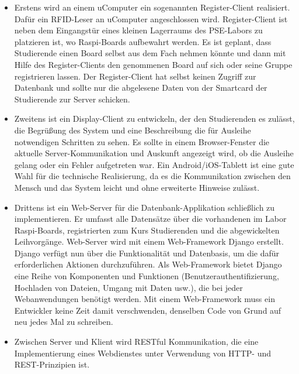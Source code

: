 \begin{itemize}
	\item Erstens wird an einem uComputer ein sogenannten Register-Client realisiert. Dafür ein RFID-Leser an uComputer angeschlossen wird. Register-Client ist neben dem Eingangstür eines kleinen Lagerraums des PSE-Labors zu platzieren ist, wo Raspi-Boards aufbewahrt werden. Es ist geplant, dass Studierende einen Board selbst aus dem Fach nehmen könnte und dann mit Hilfe des Register-Clients den genommenen Board auf sich oder seine Gruppe registrieren lassen. Der Register-Client hat selbst keinen Zugriff zur Datenbank und sollte nur die abgelesene Daten von der Smartcard der Studierende zur Server schicken. 
	\item Zweitens ist ein Display-Client zu entwickeln, der den Studierenden es zulässt, die Begrüßung des System und eine Beschreibung die für Ausleihe notwendigen Schritten zu sehen. Es sollte in einem Browser-Fenster die aktuelle Server-Kommunikation und Auskunft angezeigt wird, ob die Ausleihe gelang oder ein Fehler aufgetreten war. Ein Android/iOS-Tablett ist eine gute Wahl für die technische Realisierung, da es die Kommunikation zwischen den Mensch und das System leicht und ohne erweiterte Hinweise zulässt. 
	\item Drittens ist ein Web-Server für die Datenbank-Applikation schließlich zu implementieren. Er umfasst alle Datensätze über die vorhandenen im Labor Raspi-Boards, registrierten zum Kurs Studierenden und die abgewickelten Leihvorgänge.  Web-Server wird mit einem Web-Framework Django erstellt. Django verfügt nun über die Funktionalität und Datenbasis, um die dafür erforderlichen Aktionen durchzuführen. Als Web-Framework bietet Django eine Reihe von Komponenten und Funktionen (Benutzerauthentifizierung, Hochladen von Dateien, Umgang mit Daten usw.), die bei jeder Webanwendungen benötigt werden. Mit einem Web-Framework muss ein Entwickler keine Zeit damit verschwenden, denselben Code von Grund auf neu jedes Mal zu schreiben.
	\item Zwischen Server und Klient wird RESTful Kommunikation, die eine Implementierung eines Webdienstes unter Verwendung von HTTP- und REST-Prinzipien ist.
\end{itemize}

